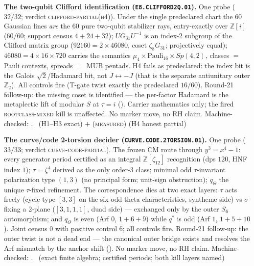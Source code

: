 \documentclass[11pt,a4paper]{article}
\newcommand{\Z}{\mathbb{Z}}
\theoremstyle{definition}
\begin{document}
\par\smallskip\noindent\textbf{The two-qubit Clifford identification
(\texttt{E8.CLIFFORD2Q.01}).}
One probe ($32/32$; verdict \textsc{clifford-partial(h4)}).  Under
the single predeclared chart the $60$ Gaussian lines \emph{are} the
$60$ pure two-qubit stabilizer rays, entry-exactly over $\Z[i]$
($60/60$; support census $4+24+32$); $UG_{31}U^{-1}$ is an index-2
subgroup of the Clifford matrix group ($92160=2\times46080$, coset
$\zeta_8G_{31}$; projectively equal); $46080=4\times16\times720$
carries the semantics $\mu_4\times\mathrm{Pauli}_{16}\times
Sp(4,2)$, classes $=$ Pauli contexts, spreads $=$ MUB pentads.  H4
fails as predeclared: the index bit is the Galois
$\sqrt2$/Hadamard bit, not $J\leftrightarrow-J$ (that is the
separate antiunitary outer $\Z_2$).  All controls fire (T-gate
twist exactly the predeclared $16/60$).  Round-21 follow-up: the
missing coset is identified --- the per-factor Hadamard is the
metaplectic lift of modular $S$ at $\tau=i$
().  Carrier mathematics
only; the fired \textsc{rootclass-mixed} kill is unaffected.  No
marker move, no RH claim.
Machine-checked: .
\mE\ (H1--H3 exact) $+$ (\textsc{measured}) (H4 honest partial)
\par\smallskip

\par\smallskip\noindent\textbf{The curve/code 2-torsion decider
(\texttt{CURVE.CODE.2TORSION.01}).}
One probe ($33/33$; verdict \textsc{curve-code-partial}).  The
frozen CM route through $y^3=x^4-1$: every generator period
certified as an integral $\Z[\zeta_{12}]$ recognition (dps $120$,
HNF index $1$); $\tau=\zeta^4$ derived as the only order-3 class;
minimal odd $\tau$-invariant polarization type $(1,3)$ (no
principal form; unit-sign obstruction); $q_\Theta$ the unique
$\tau$-fixed refinement.  The correspondence dies at two exact
layers: $\tau$ acts freely (cycle type $[3,3]$ on the six odd theta
characteristics, syntheme side) vs $\bar\sigma$ fixing a 2-plane
($[3,1,1,1]$, duad side) --- exchanged only by the outer $S_6$
automorphism; and $q_\Theta$ is even (Arf $0$, $1{+}6{+}9$) while
$q^{*}$ is odd (Arf $1$, $1{+}5{+}10$).  Joint census $0$ with
positive control $6$; all controls fire.  Round-21 follow-up: the
outer twist is not a dead end --- the canonical outer bridge
exists and resolves the Arf mismatch by the anchor shift
().  No marker move, no RH
claim.
Machine-checked: .
\mE\ (exact finite algebra; certified periods; both kill layers
named)
\par\smallskip
\end{document}
